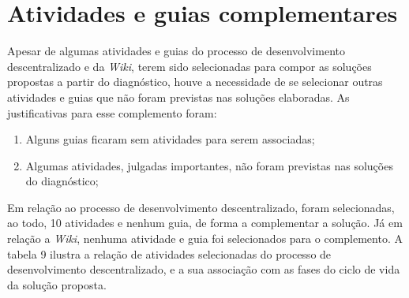 \section{Atividades e guias complementares}

Apesar de algumas atividades e guias do processo de desenvolvimento descentralizado e da \textit{Wiki}, terem sido selecionadas para compor as soluções propostas a partir do diagnóstico, houve a necessidade de se selecionar outras atividades e guias que não foram previstas nas soluções elaboradas. As justificativas para esse complemento foram:

\begin{enumerate}
\item Alguns guias ficaram sem atividades para serem associadas;
\item Algumas atividades, julgadas importantes, não foram previstas nas soluções do diagnóstico;
\end{enumerate}

Em relação ao processo de desenvolvimento descentralizado, foram selecionadas, ao todo, 10 atividades e nenhum guia, de forma a complementar a solução. Já em relação a \textit{Wiki}, nenhuma atividade e guia foi selecionados para o complemento. A tabela 9 ilustra a relação de atividades selecionadas do processo de desenvolvimento descentralizado, e a sua associação com as fases do ciclo de vida da solução proposta.\clearpage

